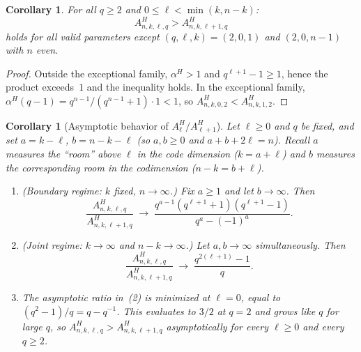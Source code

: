 \documentclass[10pt,a4paper]{amsart}
\newtheorem{corollary}[theorem]{Corollary}
\begin{document}
\begin{corollary}\label{cor:Amonotone}
For all $q \geq 2$ and $0\leq\ell<\min(k, n-k)$:
\[
  A^H_{n,k,\ell,q} > A^H_{n,k,\ell+1,q}
\]
holds for all valid parameters except $(q, \ell, k) = (2, 0, 1)$ and $(2, 0, n-1)$ with $n$ even.
\end{corollary}

\begin{proof}
Outside the exceptional family, $\alpha^H > 1$ and $q^{\ell+1}-1 \geq 1$, hence the product
exceeds~$1$ and the inequality holds.
In the exceptional family, $\alpha^H(q-1) = q^{n-1}/(q^{n-1}+1) \cdot 1 < 1$,
so $A^H_{n,k,0,2} < A^H_{n,k,1,2}$.
\end{proof}

\begin{corollary}[Asymptotic behavior of $A^H_\ell / A^H_{\ell+1}$]\label{cor:alpha-herm-asym}
Let $\ell \geq 0$ and $q$ be fixed, and set $a = k - \ell$, $b = n - k - \ell$
(so $a, b \geq 0$ and $a + b + 2\ell = n$). Recall $a$ measures the
``room'' above $\ell$ in the code dimension ($k = a + \ell$) and $b$ measures
the corresponding room in the codimension ($n - k = b + \ell$).
\begin{enumerate}
\item (\emph{Boundary regime: $k$ fixed, $n \to \infty$.})
Fix $a \geq 1$ and let $b \to \infty$. Then
\[
  \frac{A^H_{n,k,\ell,q}}{A^H_{n,k,\ell+1,q}}
  \;\longrightarrow\; \frac{q^{a-1}(q^{\ell+1}+1)(q^{\ell+1}-1)}{q^a - (-1)^a}.
\]
\item (\emph{Joint regime: $k \to \infty$ and $n - k \to \infty$.})
Let $a, b \to \infty$ simultaneously. Then
\[
  \frac{A^H_{n,k,\ell,q}}{A^H_{n,k,\ell+1,q}}
  \;\longrightarrow\; \frac{q^{2(\ell+1)} - 1}{q}.
\]
\item The asymptotic ratio in~(2) is minimized at $\ell = 0$, equal to
$(q^2 - 1)/q = q - q^{-1}$. This evaluates to $3/2$ at $q = 2$ and grows
like $q$ for large $q$, so $A^H_{n,k,\ell,q} > A^H_{n,k,\ell+1,q}$
asymptotically for every $\ell \geq 0$ and every $q \geq 2$.
\end{enumerate}
\end{corollary}
\end{document}

